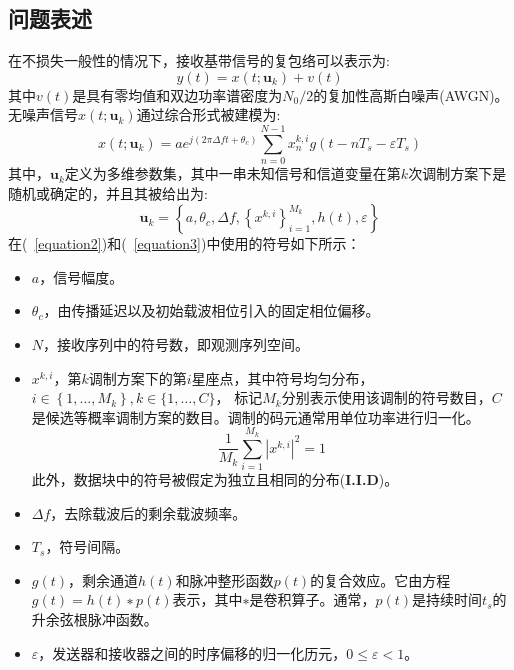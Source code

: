 \documentclass[final]{cvpr}
\begin{document}
\subsection{问题表述}
\label{sec:Problemfor}
在不损失一般性的情况下，接收基带信号的复包络可以表示为:
\begin{equation}
y(t)=x\left(t ; \mathbf{u}_{k}\right)+v(t)\label{equation1}
\end{equation}
其中$v(t)$是具有零均值和双边功率谱密度为$N_0/2$的复加性高斯白噪声(AWGN)。无噪声信号$x\left(t ; \mathbf{u}_{k}\right)$通过综合形式被建模为:
\begin{equation}
x\left(t ; \mathbf{u}_{k}\right)=a e^{j\left(2 \pi \Delta f t+\theta_{c}\right)} \sum_{n=0}^{N-1} x_{n}^{k, i} g\left(t-n T_{s}-\varepsilon T_{s}\right)\label{equation2}
\end{equation}
其中，$\mathbf{u}_{k}$定义为多维参数集，其中一串未知信号和信道变量在第$k$次调制方案下是随机或确定的，并且其被给出为:
\begin{equation}
\mathbf{u}_{k}=\left\{a, \theta_{c}, \Delta f,\left\{x^{k, i}\right\}_{i=1}^{M_{k}}, h(t), \varepsilon\right\}\label{equation3}
\end{equation}
在(~\ref{equation2})和(~\ref{equation3})中使用的符号如下所示：
\begin{itemize}
\item $a$，信号幅度。
\item $\theta_{c}$，由传播延迟以及初始载波相位引入的固定相位偏移。
\item $N$，接收序列中的符号数，即观测序列空间。
\item $x^{k, i}$，第$k$调制方案下的第$i$星座点，其中符号均匀分布，
$i \in\left\{1, \ldots, M_{k}\right\}, k \in\{1, \ldots, C\}$，
标记$M_k$分别表示使用该调制的符号数目，$C$是候选等概率调制方案的数目。调制的码元通常用单位功率进行归一化。
\begin{equation}
\frac{1}{M_{k}} \sum_{i=1}^{M_{k}}\left|x^{k, i}\right|^{2}=1\label{equation4}
\end{equation}
此外，数据块中的符号被假定为独立且相同的分布(\textbf{I.I.D})。
\item $\Delta f$，去除载波后的剩余载波频率。
\item $T_s$，符号间隔。
\item $g(t)$，剩余通道$h(t)$和脉冲整形函数$p(t)$的复合效应。它由方程$g(t)=h(t)∗p(t)$表示，其中$∗$是卷积算子。通常，$p(t)$是持续时间$t_s$的升余弦根脉冲函数。
\item $\varepsilon$，发送器和接收器之间的时序偏移的归一化历元，$0≤ε<1$。
\end{itemize}
\end{document}
